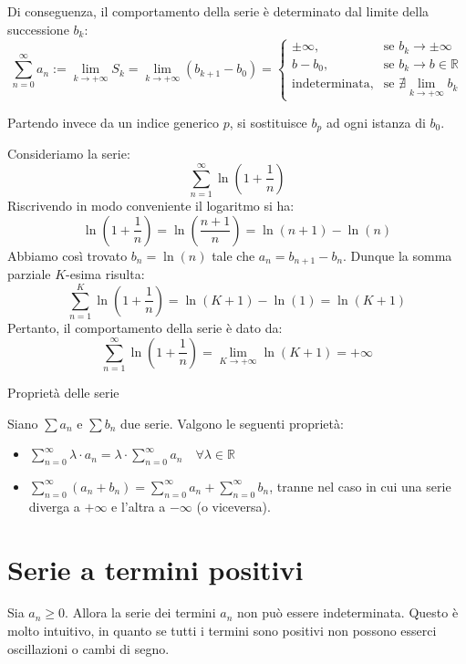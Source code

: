 \documentclass[12pt]{report}
\begin{document}
	Di conseguenza, il comportamento della serie è determinato dal limite della successione $b_k$:
	\[
	\sum_{n=0}^{\infty} a_n := \lim_{k \to +\infty} S_k = \lim_{k \to +\infty} (b_{k+1} - b_0) = 
	\begin{cases}
		\pm\infty, & \text{se } b_k \to \pm\infty \\
		b - b_0, & \text{se } b_k \to b \in \mathbb{R} \\
		\text{indeterminata}, & \text{se } \nexists \lim_{k \to +\infty} b_k
	\end{cases}
	\]
	
	Partendo invece da un indice generico $p$, si sostituisce $b_p$ ad ogni istanza di $b_0$.
	
	Consideriamo la serie:
	\[
	\sum_{n=1}^{\infty} \ln\left(1 + \frac{1}{n}\right)
	\]
	Riscrivendo in modo conveniente il logaritmo si ha:
	\[
	\ln\left(1 + \frac{1}{n}\right) = \ln\left(\frac{n+1}{n}\right) = \ln(n+1) - \ln(n)
	\]
	Abbiamo così trovato $b_n = \ln(n)$ tale che $a_n = b_{n+1} - b_n$. Dunque la somma parziale $K$-esima risulta:
	\[
	\sum_{n=1}^{K} \ln\left(1 + \frac{1}{n}\right) = \ln(K+1) - \ln(1) = \ln(K+1)
	\]
	Pertanto, il comportamento della serie è dato da:
	\[
	\sum_{n=1}^{\infty} \ln\left(1 + \frac{1}{n}\right) = \lim_{K \to +\infty} \ln(K+1) = +\infty
	\]
	
	\begin{proposizione}{Proprietà delle serie}{}
		
		Siano $\sum a_n$ e $\sum b_n$ due serie. Valgono le seguenti proprietà:
		\begin{itemize}
			
			\item $\sum_{n=0}^{\infty} \lambda \cdot a_n = \lambda \cdot \sum_{n=0}^{\infty} a_n \quad \forall \lambda \in \mathbb{R}$
			
			\item $\sum_{n=0}^{\infty} (a_n + b_n) = \sum_{n=0}^{\infty} a_n + \sum_{n=0}^{\infty} b_n$, tranne nel caso in cui una serie diverga a $+\infty$ e l'altra a $-\infty$ (o viceversa).
			
		\end{itemize}
		
	\end{proposizione}
	
	\section{Serie a termini positivi}
	
	Sia $a_n \geq 0$. Allora la serie dei termini $a_n$ non può essere indeterminata. Questo è molto intuitivo, in quanto se tutti i termini sono positivi non possono esserci oscillazioni o cambi di segno.
	
\end{document}
